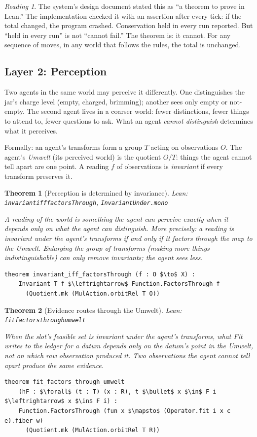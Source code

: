 \documentclass[11pt]{article}
\newcommand{\leanus}{\textunderscore\allowbreak}
\newcommand{\lean}[1]{{\let\_\leanus\texttt{#1}}}
\newtheorem{theorem}{Theorem}[section]
\theoremstyle{remark}
\newtheorem*{reading}{Reading}
\begin{document}
\begin{reading}
The system's design document stated this as ``a theorem to prove in Lean.'' The
implementation checked it with an assertion after every tick: if the total changed, the
program crashed. Conservation held in every run reported. But ``held in every run'' is not
``cannot fail.'' The theorem is: it cannot. For any sequence of moves, in any world that
follows the rules, the total is unchanged.
\end{reading}

\subsection{Layer 2: Perception}

Two agents in the same world may perceive it differently. One distinguishes the jar's
charge level (empty, charged, brimming); another sees only empty or not-empty. The second
agent lives in a coarser world: fewer distinctions, fewer things to attend to, fewer
questions to ask. What an agent \emph{cannot distinguish} determines what it perceives.

Formally: an agent's transforms form a group $T$ acting on observations $O$. The agent's
\emph{Umwelt} (its perceived world) is the quotient $O/T$: things the agent cannot tell
apart are one point. A reading $f$ of observations is \emph{invariant} if every transform
preserves it.

\begin{theorem}[Perception is determined by invariance]
{\small\sloppy Lean: \lean{invariant\_iff\_factorsThrough},
\lean{InvariantUnder.mono}\par}
A reading of the world is something the agent can perceive exactly when it depends only on
what the agent can distinguish. More precisely: a reading is invariant under the agent's
transforms if and only if it factors through the map to the Umwelt. Enlarging the group of
transforms (making more things indistinguishable) can only remove invariants; the agent
sees less.
\begin{lstlisting}
theorem invariant_iff_factorsThrough (f : O $\to$ X) :
    Invariant T f $\leftrightarrow$ Function.FactorsThrough f
      (Quotient.mk (MulAction.orbitRel T O))
\end{lstlisting}
\end{theorem}

\begin{theorem}[Evidence routes through the Umwelt]
{\small\sloppy Lean: \lean{fit\_factors\_through\_umwelt}\par}
When the slot's feasible set is invariant under the agent's transforms, what Fit writes to
the ledger for a datum depends only on the datum's point in the Umwelt, not on which raw
observation produced it. Two observations the agent cannot tell apart produce the same
evidence.
\begin{lstlisting}
theorem fit_factors_through_umwelt
    (hF : $\forall$ (t : T) (x : R), t $\bullet$ x $\in$ F i $\leftrightarrow$ x $\in$ F i) :
    Function.FactorsThrough (fun x $\mapsto$ (Operator.fit i x c e).fiber w)
      (Quotient.mk (MulAction.orbitRel T R))
\end{lstlisting}
\end{theorem}
\end{document}
